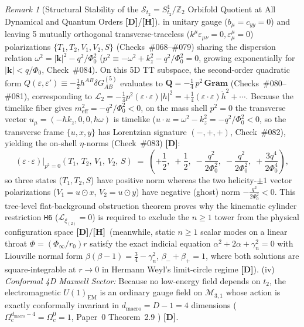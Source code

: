 \documentclass[11pt,a4paper]{article}
\newcommand{\catD}{\textbf{\textcolor{blue!75!black}{[D]}}}
\newcommand{\catH}{\textbf{\textcolor{orange!85!black}{[H]}}}
\theoremstyle{definition}
\theoremstyle{remark}
\newtheorem{remark}[theorem]{Remark}
\begin{document}
\begin{remark}[Structural Stability of the $\mathcal{S}_{t_2} = S^1_{t_2}/\mathbb{Z}_2$ Orbifold Quotient at All Dynamical and Quantum Orders \catD/\catH]
in unitary gauge ($b_\mu = c_{yy} = 0$) and leaving 5 mutually orthogonal transverse-traceless ($k^\mu\varepsilon_{\mu\nu} = 0, \varepsilon^\mu_\mu = 0$) polarizations $\{T_1, T_2, V_1, V_2, S\}$ (Checks~\#068--\#079) sharing the dispersion relation $\omega^2 = |\mathbf{k}|^2 - q^2/\Phi_0^2$ ($p^2 \equiv -\omega^2 + k_z^2 - q^2/\Phi_0^2 = 0$, growing exponentially for $|\mathbf{k}| < q/\Phi_0$, Check~\#084). On this 5D TT subspace, the second-order quadratic form $Q(\varepsilon, \varepsilon') \equiv -\frac{1}{2}h^{AB}\delta G_{AB}^{(5)}$ evaluates to $\mathbf{Q} = -\frac{1}{4}\,p^2\,\mathbf{Gram}$ (Checks~\#080--\#081), corresponding to $\mathcal{L}_2 = -\frac{1}{4}p^2(\varepsilon\cdot\varepsilon)|h|^2 = +\frac{1}{4}(\varepsilon\cdot\varepsilon)\dot{h}^2 + \cdots$. Because the timelike fiber gives $m_{\text{eff}}^2 = -q^2/\Phi_0^2 < 0$, on the mass shell $p^2 = 0$ the transverse vector $u_\mu = (-\hbar k_z, 0, 0, \hbar\omega)$ is timelike ($u\cdot u = \omega^2 - k_z^2 = -q^2/\Phi_0^2 < 0$, so the transverse frame $\{u, x, y\}$ has Lorentzian signature $(-,+,+)$, Check~\#082), yielding the on-shell $\eta$-norms (Check~\#083) \catD:
\begin{equation}
  (\varepsilon\cdot\varepsilon)\big|_{p^2 = 0}\!\left(T_1,\, T_2,\, V_1,\, V_2,\, S\right) \;=\; \left(+\frac{1}{2},\; +\frac{1}{2},\; -\frac{q^2}{2\Phi_0^2},\; -\frac{q^2}{2\Phi_0^2},\; +\frac{3q^4}{2\Phi_0^4}\right),
  \label{eq:node_c_kk_norms}
\end{equation}
so three states ($T_1, T_2, S$) have positive norm whereas the two helicity-$\pm 1$ vector polarizations ($V_1 = u \odot x$, $V_2 = u \odot y$) have negative (ghost) norm $-\frac{q^2}{2\Phi_0^2} < 0$. This tree-level flat-background obstruction theorem proves why the kinematic cylinder restriction \texttt{H6} ($\mathcal{L}_{\xi_{(2)}} = 0$) is required to exclude the $n \ge 1$ tower from the physical configuration space \catD/\catH\ (meanwhile, static $n \ge 1$ scalar modes on a linear throat $\Phi = (\Phi_\infty/r_0)r$ satisfy the exact indicial equation $\alpha^2 + 2\alpha + \gamma_n^2 = 0$ with Liouville normal form $\beta(\beta - 1) = \frac{3}{4} - \gamma_n^2$, $\beta_- + \beta_+ = 1$, where both solutions are square-integrable at $r \to 0$ in Hermann Weyl's limit-circle regime \catD).
(iv) \emph{Conformal 4D Maxwell Sector:} Because no low-energy field depends on $t_2$, the electromagnetic $U(1)_{\text{EM}}$ is an ordinary gauge field on $\mathcal{M}_{3,1}$ whose action is exactly conformally invariant in $d_{\text{macro}} = D - 1 = 4$ dimensions ($\Omega_c^{d_{\text{macro}} - 4} = \Omega_c^0 = 1$, Paper~0 Theorem~2.9 \cite{JV_Paper0}) \catD.
\end{remark}
\end{document}
